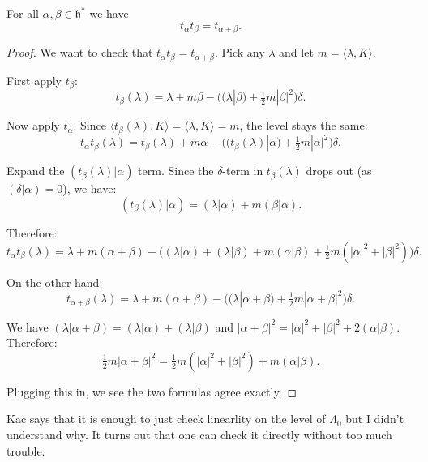 \documentclass[12pt]{article}
\begin{document}
\begin{proposition}
    For all $\alpha, \beta \in \mathfrak{h}^*$ we have
    \begin{equation}
        t_\alpha t_\beta = t_{\alpha+\beta}.
    \end{equation}
\end{proposition}
\begin{proof}

    We want to check that $t_\alpha t_\beta = t_{\alpha+\beta}$. Pick any $\lambda$ and let $m = \langle\lambda,K\rangle$.

    First apply $t_\beta$:
    \[
        t_\beta(\lambda) = \lambda + m\beta - \Big((\lambda|\beta) + \tfrac12 m|\beta|^2\Big)\delta.
    \]

    Now apply $t_\alpha$. Since $\langle t_\beta(\lambda),K\rangle = \langle \lambda,K\rangle = m$, the level stays the same:
    \[
        t_\alpha t_\beta(\lambda) = t_\beta(\lambda) + m\alpha - \Big((t_\beta(\lambda)|\alpha) + \tfrac12 m|\alpha|^2\Big)\delta.
    \]

    Expand the $(t_\beta(\lambda)|\alpha)$ term. Since the $\delta$-term in $t_\beta(\lambda)$ drops out (as $(\delta|\alpha)=0$), we have:
    \[
        (t_\beta(\lambda)|\alpha) = (\lambda|\alpha) + m(\beta|\alpha).
    \]

    Therefore:
    \[
        t_\alpha t_\beta(\lambda) = \lambda + m(\alpha+\beta) - \Big( (\lambda|\alpha) + (\lambda|\beta) + m(\alpha|\beta) + \tfrac12 m(|\alpha|^2+|\beta|^2)\Big)\delta.
    \]

    On the other hand:
    \[
        t_{\alpha+\beta}(\lambda) = \lambda + m(\alpha+\beta) - \Big( (\lambda|\alpha+\beta) + \tfrac12 m|\alpha+\beta|^2\Big)\delta.
    \]

    We have $(\lambda|\alpha+\beta) = (\lambda|\alpha)+(\lambda|\beta)$ and $|\alpha+\beta|^2 = |\alpha|^2 + |\beta|^2 + 2(\alpha|\beta)$. Therefore:
    \[
        \tfrac12 m|\alpha+\beta|^2 = \tfrac12 m(|\alpha|^2+|\beta|^2) + m(\alpha|\beta).
    \]

    Plugging this in, we see the two formulas agree exactly. \end{proof}
\begin{remark}
    Kac says that it is enough to just check linearlity on the level of $\Lambda_0$ but I didn't understand why. It turns out that one can check it directly without too much trouble.
\end{remark}
\end{document}
